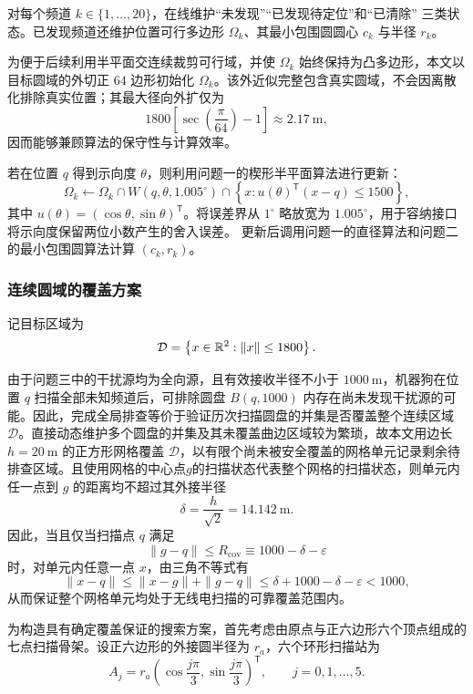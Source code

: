 对每个频道 $k\in\{1,\ldots,20\}$，在线维护“未发现”“已发现待定位”和“已清除”
三类状态。已发现频道还维护位置可行多边形 $\Omega_k$、其最小包围圆圆心 $c_k$ 与半径
$r_k$。

为便于后续利用半平面交连续裁剪可行域，并使 \(\Omega_k\) 始终保持为凸多边形，本文以目标圆域的外切正 \(64\) 边形初始化 \(\Omega_k\)。该外近似完整包含真实圆域，不会因离散化排除真实位置；其最大径向外扩仅为  
\[
1800\left[\sec\left(\frac{\pi}{64}\right)-1\right]\approx2.17\ \mathrm m,
\]因而能够兼顾算法的保守性与计算效率。

若在位置 $q$ 得到示向度
$\theta$，则利用问题一的楔形半平面算法进行更新：
\begin{equation}
\Omega_k\leftarrow
\Omega_k\cap W(q,\theta,1.005^\circ)
\cap\left\{x:u(\theta)^{\mathsf T}(x-q)\le 1500\right\},
\label{eq:p3-region-update}
\end{equation}
其中 $u(\theta)=(\cos\theta,\sin\theta)^{\mathsf T}$。将误差界从 $1^\circ$
略放宽为 $1.005^\circ$，用于容纳接口将示向度保留两位小数产生的舍入误差。
更新后调用问题一的直径算法和问题二的最小包围圆算法计算 $(c_k,r_k)$。

\subsubsection{连续圆域的覆盖方案}

记目标区域为
\begin{equation}
\mathcal D=\left\{x\in\mathbb{R}^2:\|x\|\le1800\right\}.
\end{equation}

由于问题三中的干扰源均为全向源，且有效接收半径不小于 \(1000\ \mathrm m\)，机器狗在位置 \(q\) 扫描全部未知频道后，可排除圆盘 \(B(q,1000)\) 内存在尚未发现干扰源的可能。因此，完成全局排查等价于验证历次扫描圆盘的并集是否覆盖整个连续区域 \(\mathcal D\)。直接动态维护多个圆盘的并集及其未覆盖曲边区域较为繁琐，故本文用边长 \(h=20\ \mathrm m\) 的正方形网格覆盖 \(\mathcal D\)，以有限个尚未被安全覆盖的网格单元记录剩余待排查区域。且使用网格的中心点\(g\)的扫描状态代表整个网格的扫描状态，则单元内任一点到 \(g\) 的距离均不超过其外接半径
\[
\delta=\frac{h}{\sqrt2}=14.142\ \mathrm m.
\]因此，当且仅当扫描点 \(q\) 满足
\[
\|g-q\|\le R_{\mathrm{cov}}
\equiv1000-\delta-\varepsilon
\]时，对单元内任意一点 \(x\)，由三角不等式有
\[
\|x-q\|
\le\|x-g\|+\|g-q\|
\le\delta+1000-\delta-\varepsilon
<1000,
\]从而保证整个网格单元均处于无线电扫描的可靠覆盖范围内。

为构造具有确定覆盖保证的搜索方案，首先考虑由原点与正六边形六个顶点组成的七点扫描骨架。设正六边形的外接圆半径为 $r_a$，六个环形扫描站为
\begin{equation}
A_j=r_a
\left(
\cos\frac{j\pi}{3},
\sin\frac{j\pi}{3}
\right)^{\mathsf T},
\qquad j=0,1,\ldots,5.
\end{equation}

